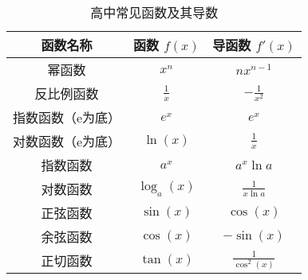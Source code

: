 \begin{table}[ht]
\centering
\caption{高中常见函数及其导数}\label{tab_HsDerv1}
\begin{tabular}{|c|c|c|}
\hline
\textbf{函数名称}     & \textbf{函数 $f(x)$}     & \textbf{导函数 $f'(x)$}     \\ \hline
幂函数&$x^n$                    & $n x^{n-1}$                \\ \hline
反比例函数&$\displaystyle\frac{1}{x}$             & $\displaystyle-\frac{1}{x^2}$           \\ \hline
指数函数（e为底）&$e^x$                     & $e^x$                      \\ \hline
对数函数（e为底）&$\ln(x)$                  & $\displaystyle\frac{1}{x}$              \\ \hline
指数函数&$a^x$                     & $a^x\ln a $                      \\ \hline
对数函数&$\log_a(x)$                  & $\displaystyle \frac{1}{x\ln a}$              \\ \hline
正弦函数&$\sin(x)$                 & $\cos(x)$                  \\ \hline
余弦函数&$\cos(x)$                 & $-\sin(x)$                 \\ \hline
正切函数&$\tan(x)$                 & $\displaystyle \frac{1}{\cos^2(x)}$                \\ \hline
\end{tabular}
\end{table}


